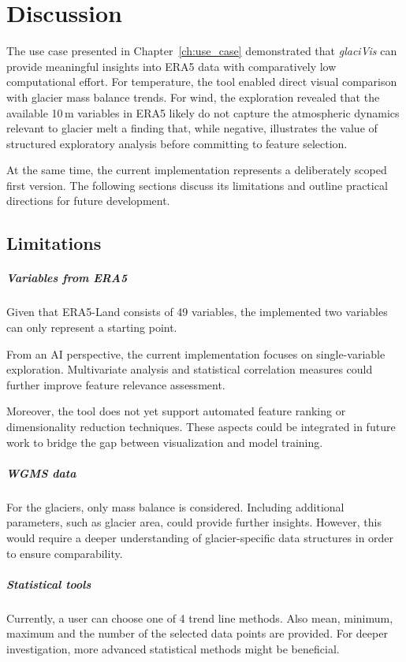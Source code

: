 \chapter{Discussion}
The use case presented in Chapter~\ref{ch:use_case} demonstrated that
\textit{glaciVis} can provide meaningful insights into ERA5 data with
comparatively low computational effort. For temperature, the tool enabled direct visual comparison with glacier mass balance trends. For wind, the exploration revealed that the available 10\,m variables in ERA5 likely do not capture the atmospheric dynamics relevant to glacier melt a finding that, while negative, illustrates the value of structured exploratory analysis before committing to feature selection.

At the same time, the current implementation represents a deliberately scoped first version. The following sections discuss its limitations and outline practical directions for future development.


\section{Limitations}

\paragraph{Variables from ERA5}
Given that ERA5-Land consists of 49 variables, the implemented two variables can only represent a starting point.

From an AI perspective, the current implementation focuses on single-variable exploration. Multivariate analysis and statistical correlation measures could further improve feature relevance assessment.

Moreover, the tool does not yet support automated feature ranking or dimensionality reduction techniques. These aspects could be integrated in future work to bridge the gap between visualization and model training.

\paragraph{WGMS data}
For the glaciers, only mass balance is considered. Including additional parameters, such as glacier area, could provide further insights. However, this would require a deeper understanding of glacier-specific data structures in order to ensure comparability.

\paragraph{Statistical tools}
Currently, a user can choose one of 4 trend line methods. Also mean, minimum, maximum and the number of the selected data points are provided. For deeper investigation, more advanced statistical methods might be beneficial. 

